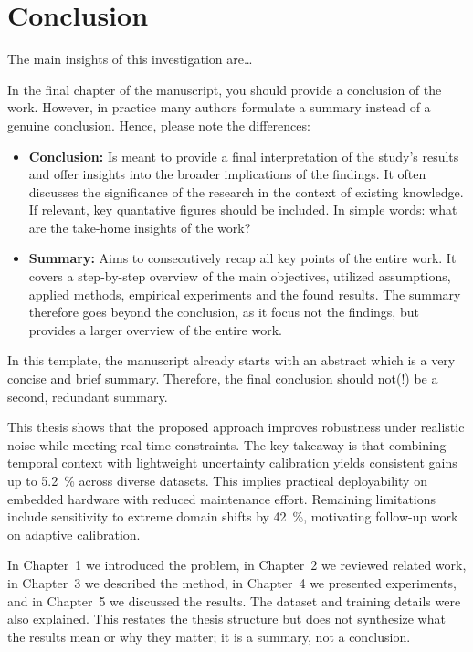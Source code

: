 \chapter{Conclusion} 
\label{cha:conclusion}

The main insights of this investigation are\ldots
\begin{infobox}
In the final chapter of the manuscript, you should provide a conclusion of the work. However, in practice many authors formulate a summary instead of a genuine conclusion. Hence, please note the differences:
\begin{itemize}
    \item \textbf{Conclusion:} Is meant to provide a final interpretation of the study's results and offer insights into the broader implications of the findings. It often discusses the significance of the research in the context of existing knowledge. If relevant, key quantative figures should be included. In simple words: what are the take-home insights of the work?
    \item \textbf{Summary:} Aims to consecutively recap all key points of the entire work. It covers a step-by-step overview of the main objectives, utilized assumptions, applied methods, empirical experiments and the found results. The summary therefore goes beyond the conclusion, as it focus not the findings, but provides a larger overview of the entire work.
\end{itemize} 
In this template, the manuscript already starts with an abstract which is a very concise and brief summary. Therefore, the final conclusion should not(!) be a second, redundant summary.   
\end{infobox}

\begin{successbox}
This thesis shows that the proposed approach improves robustness under realistic noise while meeting real-time constraints. The key takeaway is that combining temporal context with lightweight uncertainty calibration yields consistent gains up to \SI{5.2}{\percent} across diverse datasets. This implies practical deployability on embedded hardware with reduced maintenance effort. Remaining limitations include sensitivity to extreme domain shifts by \SI{42}{\percent}, motivating follow-up work on adaptive calibration.
\end{successbox}

\begin{errorbox}
In Chapter~1 we introduced the problem, in Chapter~2 we reviewed related work, in Chapter~3 we described the method, in Chapter~4 we presented experiments, and in Chapter~5 we discussed the results. The dataset and training details were also explained. This restates the thesis structure but does not synthesize what the results mean or why they matter; it is a summary, not a conclusion.
\end{errorbox}

